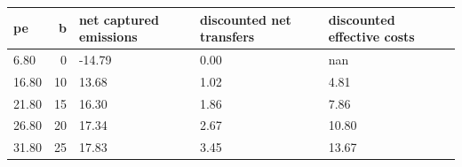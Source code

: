 \begin{tabular}{lrlll}
\toprule
pe & b & net captured emissions & discounted net transfers & discounted effective costs \\
\midrule
6.80 & 0 & -14.79 & 0.00 & nan \\
16.80 & 10 & 13.68 & 1.02 & 4.81 \\
21.80 & 15 & 16.30 & 1.86 & 7.86 \\
26.80 & 20 & 17.34 & 2.67 & 10.80 \\
31.80 & 25 & 17.83 & 3.45 & 13.67 \\
\bottomrule
\end{tabular}
